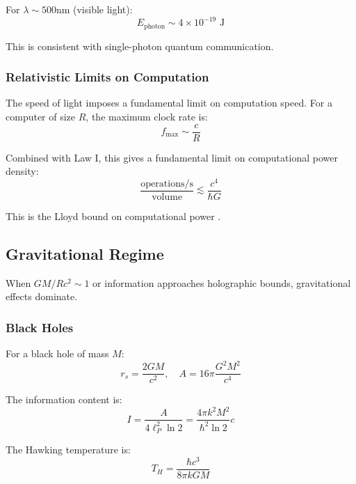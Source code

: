 \documentclass[11pt,a4paper]{article}
\theoremstyle{plain}
\theoremstyle{definition}
\theoremstyle{remark}
\begin{document}
For $\lambda \sim 500$nm (visible light):
\begin{equation}
E_{\text{photon}} \sim 4\times 10^{-19}\text{ J}
\end{equation}

This is consistent with single-photon quantum communication.

\subsubsection{Relativistic Limits on Computation}

The speed of light imposes a fundamental limit on computation speed. For a computer of size $R$, the maximum clock rate is:
\begin{equation}
f_{\max} \sim \frac{c}{R}
\end{equation}

Combined with Law I, this gives a fundamental limit on computational power density:
\begin{equation}
\frac{\text{operations/s}}{\text{volume}} \lesssim \frac{c^4}{\hbar G}
\end{equation}

This is the Lloyd bound on computational power \cite{lloyd2000ultimate}.

\subsection{Gravitational Regime}

When $GM/Rc^2 \sim 1$ or information approaches holographic bounds, gravitational effects dominate.

\subsubsection{Black Holes}

For a black hole of mass $M$:
\begin{equation}
r_s = \frac{2GM}{c^2}, \quad A = 16\pi\frac{G^2M^2}{c^4}
\end{equation}

The information content is:
\begin{equation}
I = \frac{A}{4\ell_P^2\ln 2} = \frac{4\pi k^2M^2}{\hbar^2\ln 2}c
\end{equation}

The Hawking temperature is:
\begin{equation}
T_H = \frac{\hbar c^3}{8\pi kGM}
\end{equation}
\end{document}
